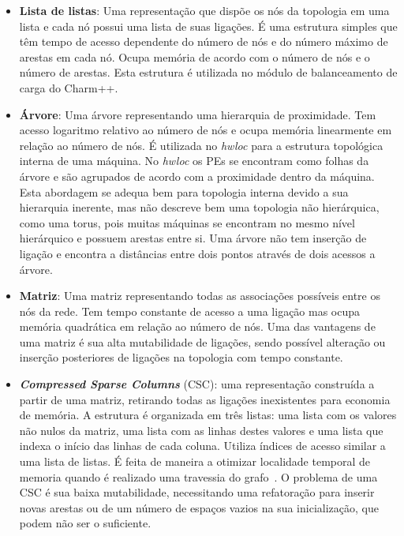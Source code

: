 \documentclass[
	12pt,				%
	openright,			%
	twoside,			%
	a4paper,			%
	english,			%
	brazil,				%
	]{abntex2}
\newcommand{\charm}{{{Charm++}}\xspace}
\newcommand{\hwloc}{{\textit{hwloc}}\xspace}
\begin{document}
\begin{itemize}
    \item \textbf{Lista de listas}: Uma representação que dispõe os nós da topologia em uma lista e cada nó possui uma lista de suas ligações. 
    É uma estrutura simples que têm tempo de acesso dependente do número de nós e do número máximo de arestas em cada nó.
    Ocupa memória de acordo com o número de nós e o número de arestas.
    Esta estrutura é utilizada no módulo de balanceamento de carga do \charm.

    \item \textbf{Árvore}: Uma árvore representando uma hierarquia de proximidade. 
    Tem acesso logaritmo relativo ao número de nós e ocupa memória linearmente em relação ao número de nós. 
    É utilizada no \hwloc para a estrutura topológica interna de uma máquina. 
    No \hwloc os PEs se encontram como folhas da árvore e são agrupados de acordo com a proximidade dentro da máquina.
    Esta abordagem se adequa bem para topologia interna devido a sua hierarquia inerente, mas não descreve bem uma topologia não hierárquica, como uma torus, pois muitas máquinas se encontram no mesmo nível hierárquico e possuem arestas entre si.
    Uma árvore não tem inserção de ligação e encontra a distâncias entre dois pontos através de dois acessos a árvore.

    \item \textbf{Matriz}: Uma matriz representando todas as associações possíveis entre os nós da rede.
    Tem tempo constante de acesso a uma ligação mas ocupa memória quadrática em relação ao número de nós.
    Uma das vantagens de uma matriz é sua alta mutabilidade de ligações, sendo possível alteração ou inserção posteriores de ligações na topologia com tempo constante.

    \item \textbf{\textit{Compressed Sparse Columns}} (CSC): uma representação construída a partir de uma matriz, retirando todas as ligações inexistentes para economia de memória.
    A estrutura é organizada em três listas: uma lista com os valores não nulos da matriz, uma lista com as linhas destes valores e uma lista que indexa o início das linhas de cada coluna.
    Utiliza índices de acesso similar a uma lista de listas.
    É feita de maneira a otimizar localidade temporal de memoria quando é realizado uma travessia do grafo~\cite{sun:csr}.
    O problema de uma CSC é sua baixa mutabilidade, necessitando uma refatoração para inserir novas arestas ou de um número de espaços vazios na sua inicialização, que podem não ser o suficiente.
\end{itemize}
\end{document}
